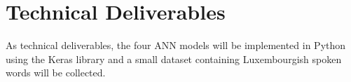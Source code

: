 \section{Technical Deliverables} 

As technical deliverables, the four ANN models will be implemented in Python
using the Keras\cite{chollet2015keras} library and a small dataset containing
Luxembourgish spoken words will be collected.
